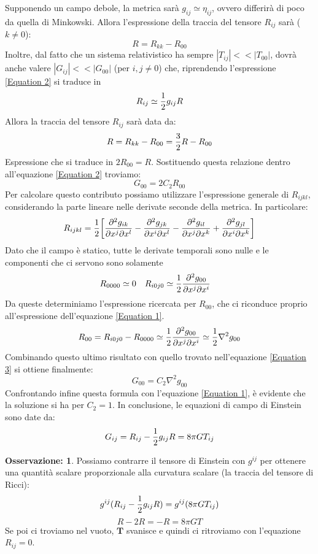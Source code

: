 \documentclass[]{report}
\theoremstyle{definition}
\theoremstyle{Theorem}
\theoremstyle{definition}
\theoremstyle{definition}
\theoremstyle{definition}
\newtheorem{Obs}[Def]{Osservazione:}
\begin{document}
Supponendo un campo debole, la metrica sarà $g_{ij}\simeq \eta_{ij}$, ovvero differirà di poco da quella di Minkowski. Allora l'espressione della traccia del tensore $R_{ij}$ sarà ($k\neq 0$):
$$R=R_{kk}-R_{00}$$
Inoltre, dal fatto che un sistema relativistico ha sempre $|T_{ij}|<<|T_{00}|$, dovrà anche valere $|G_{ij}|<<|G_{00}|$ (per $i,j\neq 0$) che, riprendendo l'espressione \ref{Equation 2} si traduce in
$$R_{ij}\simeq{1\over 2}g_{ij}R$$
Allora la traccia del tensore $R_{ij}$ sarà data da:
$$R=R_{kk}-R_{00}={3\over 2}R-R_{00}$$
Espressione che si traduce in $2R_{00}=R$. Sostituendo questa relazione dentro all'equazione \ref{Equation 2} troviamo:
\begin{equation}
	\label{Equation 3}
	G_{00}=2C_2R_{00}
\end{equation} 
Per calcolare questo contributo possiamo utilizzare l'espressione generale di $R_{ijkl}$, considerando la parte lineare nelle derivate seconde della metrica. In particolare:
$$R_{ijkl}={1\over 2}\bigg{[}{\partial^2 g_{ik} \over\partial x^j\partial x^l}-{\partial^2 g_{jk}\over\partial x^i\partial x^l}-{\partial^2 g_{il} \over\partial x^j\partial x^k}+{\partial^2 g_{jl}\over\partial x^i\partial x^k}\bigg{]}$$
Dato che il campo è statico, tutte le derivate temporali sono nulle e le componenti che ci servono sono solamente
\begin{align*}
	R_{0000}&\simeq 0 & R_{i0j0}&\simeq {1\over 2} {\partial^2 g_{00} \over\partial x^j\partial x^i}  
\end{align*}
Da queste determiniamo l'espressione ricercata per $R_{00}$, che ci riconduce proprio all'espressione dell'equazione \ref{Equation 1}.
$$R_{00}=R_{i0j0}-R_{0000}\simeq {1\over 2} {\partial^2 g_{00} \over\partial x^j\partial x^i}\simeq {1\over 2} \nabla^2 g_{00}$$
Combinando questo ultimo risultato con quello trovato nell'equazione \ref{Equation 3} si ottiene finalmente:
$$G_{00}=C_2\nabla^2g_{00}$$
Confrontando infine questa formula con l'equazione \ref{Equation 1}, è evidente che la soluzione si ha per $C_2=1$. In conclusione, le equazioni di campo di Einstein sono date da:
$$G_{ij}=R_{ij}-{1\over 2}g_{ij}R=8\pi GT_{ij}$$
\begin{Obs}
	Possiamo contrarre il tensore di Einstein con $g^{ij}$ per ottenere una quantità scalare proporzionale alla curvatura scalare (la traccia del tensore di Ricci):
	$$g^{ij}(R_{ij}-{1\over 2}g_{ij}R)=g^{ij}(8\pi GT_{ij})$$
	$$R-2R=-R=8\pi GT$$
	Se poi ci troviamo nel vuoto, $\textbf{T}$ svanisce e quindi ci ritroviamo con l'equazione $R_{ij}=0$.
\end{Obs}
\end{document}
